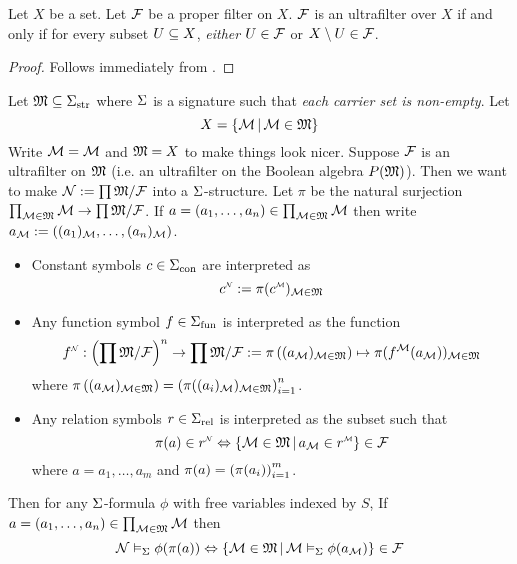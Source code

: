 \begin{prop}
    Let $X$ be a set. 
    Let $\mathcal{F}$ be a proper filter on $X$.
    $\mathcal{F}$ is an ultrafilter over $X$ if and only if for every subset 
    $U \subseteq X$, 
    \emph{either} $U \in \mathcal{F}$ or $X \setminus U \in \mathcal{F}$.
\end{prop}
\begin{proof}
    Follows immediately from .
\end{proof}

\begin{prop}
    Let $\mathfrak{M} \subseteq {\Sigma}_\mathrm{str}$ where $\Sigma$ is a signature
    such that \emph{each carrier set is non-empty}.
    Let \[X = \left\{{\mathcal{M}} \,|\, \mathcal{M} \in \mathfrak{M}\right\}\]
    Write $\mathcal{M} = {\mathcal{M}}$ and $\mathfrak{M} = X$ to make things look nicer.
    Suppose $\mathcal{F}$ is an ultrafilter on $\mathfrak{M}$ 
    (i.e. an ultrafilter on the Boolean algebra $P(\mathfrak{M})$).
    Then we want to make $\mathcal{N} := \prod \mathfrak{M} / \mathcal{F}$ into a $\Sigma$-structure.
    Let $\pi$ be the natural surjection 
    $\prod_{\mathcal{M} \in \mathfrak{M}} \mathcal{M} \to \prod \mathfrak{M} / \mathcal{F}$.
    If $a = (a_1, \dots, a_n) \in \prod_{\mathcal{M} \in \mathfrak{M}} \mathcal{M}$ then
    write $a_{\mathcal{M}} := ((a_1)_{\mathcal{M}}, \dots, (a_n)_{\mathcal{M}})$.
    \begin{itemize}
        \item Constant symbols $c \in {\Sigma}_\mathrm{con}$ are interpreted as 
            \[\modintp{\NN}{c} := \pi(\modintp{\MM}{c})_{\MM \in \f{M}}\]
        \item Any function symbol $f \in {\Sigma}_\mathrm{fun}$ is interpreted as the 
            function
            \[\modintp{\NN}{f} : 
            \brkt{\prod \f{M} / \FF}^n \to \prod \f{M} / \FF
            := \pi\brkt{(a_\MM)_{\MM \in \f{M}}} \mapsto 
            \pi(f^\MM (a_\MM))_{\MM \in \f{M}}\]
            where $\pi\left((a_{\mathcal{M}})_{\mathcal{M} \in \mathfrak{M}}\right) = 
            \left(\pi((a_i)_{\mathcal{M}})_{\mathcal{M} \in \mathfrak{M}}\right)_{i=1}^n$.
        \item Any relation symbols 
            $r \in {\Sigma}_\mathrm{rel}$ is interpreted as the subset such that 
            \[\pi(a) \in \modintp{\NN}{r}
            \iff \set{\MM \in \f{M} \st 
            a_\MM \in \modintp{\MM}{r}} \in \FF\]
            where $a = a_1,\dots, a_m$ and $\pi(a) = \left(\pi(a_i)\right)_{i=1}^m$.
    \end{itemize}
    Then for any $\Sigma$-formula $\phi$ with free variables indexed by $S$,
    If $a = (a_1, \dots, a_n) \in \prod_{\mathcal{M} \in \mathfrak{M}} \mathcal{M}$ then 
    \[\mathcal{N} \vDash_{\Sigma} \phi(\pi(a)) \Leftrightarrow 
    \left\{\mathcal{M} \in \mathfrak{M} \,|\, \mathcal{M} \vDash_{\Sigma} \phi(a_{\mathcal{M}})\right\} \in \mathcal{F}\]
\end{prop}
